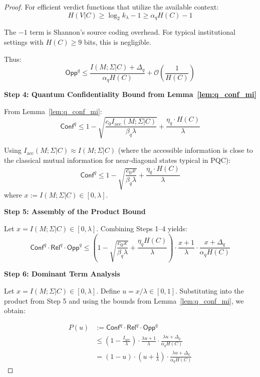 \documentclass{ieeeaccess}
\newcommand{\Conf}{\mathsf{Conf}}
\newcommand{\Rel}{\mathsf{Rel}}
\newcommand{\Opp}{\mathsf{Opp}}
\begin{document}
\begin{proof}
For efficient verdict functions that utilize the available context:
\begin{equation}
    H(V|C) \geq \log_2 k_\lambda - 1 \geq \alpha_q H(C) - 1
\end{equation}

The $-1$ term is Shannon's source coding overhead. For typical institutional settings with $H(C) \geq 9$ bits, this is negligible.

Thus:
\begin{equation}
    \Opp^q \leq \frac{I(M; \Sigma|C) + \Delta_q}{\alpha_q H(C)} + \mathcal{O}\left(\frac{1}{H(C)}\right)
\end{equation}

\textbf{Step 4: Quantum Confidentiality Bound from Lemma~\ref{lem:q_conf_mi}}

From Lemma~\ref{lem:q_conf_mi}:
\begin{equation}
    \Conf^q \leq 1 - \sqrt{\frac{c_0 I_{\mathrm{acc}}(M;\Sigma|C)}{\beta_q \lambda}} + \frac{\eta_q \cdot H(C)}{\lambda}
\end{equation}

Using $I_{\mathrm{acc}}(M;\Sigma|C) \approx I(M;\Sigma|C)$ (where the accessible information is close to the classical mutual information for near-diagonal states typical in PQC):
\begin{equation}
    \Conf^q \leq 1 - \sqrt{\frac{c_0 x}{\beta_q \lambda}} + \frac{\eta_q \cdot H(C)}{\lambda}
\end{equation}
where $x := I(M;\Sigma|C) \in [0, \lambda]$.

\textbf{Step 5: Assembly of the Product Bound}

Let $x = I(M;\Sigma|C) \in [0, \lambda]$. Combining Steps 1--4 yields:
\begin{equation}
\label{eq:product_assembly}
    \Conf^q \cdot \Rel^q \cdot \Opp^q
    \leq
    \left(1 - \sqrt{\frac{c_0 x}{\beta_q \lambda}} + \frac{\eta_q H(C)}{\lambda}\right)
    \cdot
    \frac{x + 1}{\lambda}
    \cdot
    \frac{x + \Delta_q}{\alpha_q H(C)}
\end{equation}

\textbf{Step 6: Dominant Term Analysis}

Let $x = I(M;\Sigma|C) \in [0, \lambda]$. Define $u = x/\lambda \in [0,1]$. Substituting into the product from Step 5 and using the bounds from Lemma~\ref{lem:q_conf_mi}, we obtain:

\begin{align}
    P(u) &:= \Conf^q \cdot \Rel^q \cdot \Opp^q \\
    &\leq \left(1 - \frac{I_{\mathrm{acc}}}{\lambda}\right) \cdot \frac{\lambda u + 1}{\lambda} \cdot \frac{\lambda u + \Delta_q}{\alpha_q H(C)} \\
    &= \left(1 - u\right) \cdot \left(u + \frac{1}{\lambda}\right) \cdot \frac{\lambda u + \Delta_q}{\alpha_q H(C)}
\end{align}


\end{proof}
\end{document}
